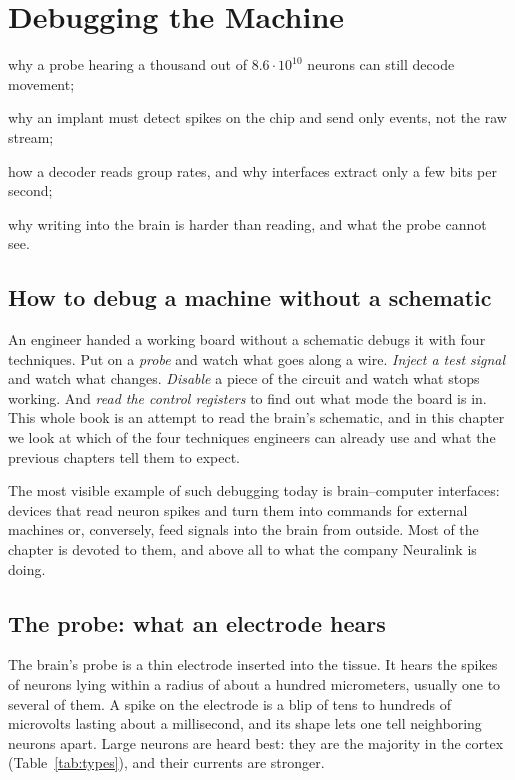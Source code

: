 \chapter{Debugging the Machine}
\label{sec:debugging}
\begin{chaptergoals}
\item why a probe hearing a thousand out of $8.6\cdot10^{10}$ neurons can still decode movement;
\item why an implant must detect spikes on the chip and send only events, not the raw stream;
\item how a decoder reads group rates, and why interfaces extract only a few bits per second;
\item why writing into the brain is harder than reading, and what the probe cannot see.
\end{chaptergoals}

\section{How to debug a machine without a schematic}

An engineer handed a working board without a schematic debugs it with four techniques. Put on a \emph{probe} and watch what goes along a wire. \emph{Inject a test signal} and watch what changes. \emph{Disable} a piece of the circuit and watch what stops working. And \emph{read the control registers} to find out what mode the board is in. This whole book is an attempt to read the brain's schematic, and in this chapter we look at which of the four techniques engineers can already use and what the previous chapters tell them to expect.

The most visible example of such debugging today is brain–computer interfaces: devices that read neuron spikes and turn them into commands for external machines or, conversely, feed signals into the brain from outside. Most of the chapter is devoted to them, and above all to what the company Neuralink is doing.

\section{The probe: what an electrode hears}

The brain's probe is a thin electrode inserted into the tissue. It hears the spikes of neurons lying within a radius of about a hundred micrometers, usually one to several of them. A spike on the electrode is a blip of tens to hundreds of microvolts lasting about a millisecond, and its shape lets one tell neighboring neurons apart. Large  neurons are heard best: they are the majority in the cortex (Table~\ref{tab:types}), and their currents are stronger.

